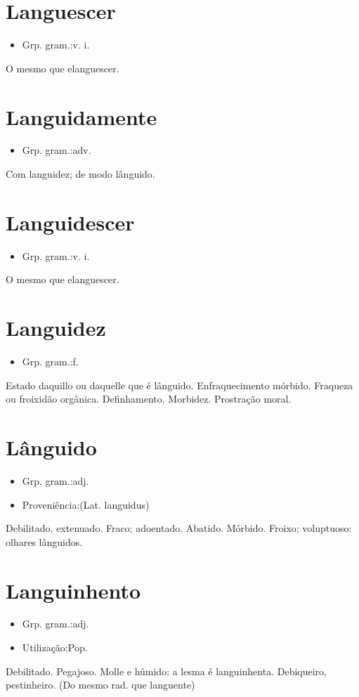 \section{Languescer}
\begin{itemize}
\item {Grp. gram.:v. i.}
\end{itemize}
O mesmo que \textunderscore elanguescer\textunderscore .
\section{Languidamente}
\begin{itemize}
\item {Grp. gram.:adv.}
\end{itemize}
Com languidez; de modo lânguido.
\section{Languidescer}
\begin{itemize}
\item {Grp. gram.:v. i.}
\end{itemize}
O mesmo que \textunderscore elanguescer\textunderscore .
\section{Languidez}
\begin{itemize}
\item {Grp. gram.:f.}
\end{itemize}
Estado daquillo ou daquelle que é lânguido.
Enfraquecimento mórbido.
Fraqueza ou froixidão orgânica.
Definhamento.
Morbidez.
Prostração moral.
\section{Lânguido}
\begin{itemize}
\item {Grp. gram.:adj.}
\end{itemize}
\begin{itemize}
\item {Proveniência:(Lat. \textunderscore languidus\textunderscore )}
\end{itemize}
Debilitado, extenuado.
Fraco; adoentado.
Abatido.
Mórbido.
Froixo; voluptuoso: \textunderscore olhares lânguidos\textunderscore .
\section{Languinhento}
\begin{itemize}
\item {Grp. gram.:adj.}
\end{itemize}
\begin{itemize}
\item {Utilização:Pop.}
\end{itemize}
Debilitado.
Pegajoso.
Molle e húmido: \textunderscore a lesma é languinhenta\textunderscore .
Debiqueiro, pestinheiro.
(Do mesmo rad. que \textunderscore languente\textunderscore )
